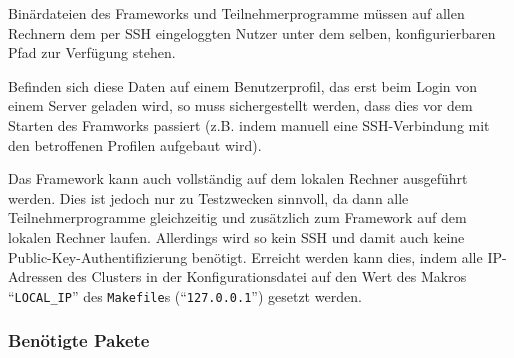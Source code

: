 \documentclass[a4paper, 12pt]{article}
\begin{document}
Binärdateien des Frameworks und Teilnehmerprogramme müssen auf allen
Rechnern dem per SSH eingeloggten Nutzer unter dem selben, konfigurierbaren
Pfad zur Verfügung stehen.

Befinden sich diese Daten auf einem Benutzerprofil, das erst beim Login von
einem Server geladen wird, so muss sichergestellt werden, dass dies vor dem
Starten des Framworks passiert (z.B. indem manuell eine SSH-Verbindung mit
den betroffenen Profilen aufgebaut wird).

Das Framework kann auch vollständig auf dem lokalen Rechner ausgeführt werden.
Dies ist jedoch nur zu Testzwecken sinnvoll, da dann alle Teilnehmerprogramme
gleichzeitig und zusätzlich zum Framework auf dem lokalen Rechner laufen.
Allerdings wird so kein SSH und damit auch keine
Public-Key-Authentifizierung benötigt.
Erreicht werden kann dies, indem alle IP-Adressen des Clusters in der
Konfigurationsdatei auf den Wert des Makros ``\texttt{LOCAL\_IP}'' des
\texttt{Makefile}s (``\texttt{127.0.0.1}'') gesetzt werden.

\subsubsection{Benötigte Pakete}
\end{document}
